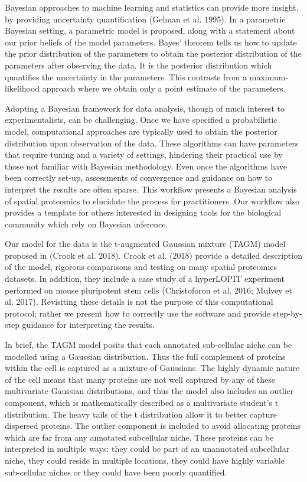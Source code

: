 \documentclass[
]{article}
\begin{document}
Bayesian approaches to machine learning and statistics can provide more
insight, by providing uncertainty quantification (Gelman et al. 1995).
In a parametric Bayesian setting, a parametric model is proposed, along
with a statement about our prior beliefs of the model parameters. Bayes'
theorem tells us how to update the prior distribution of the parameters
to obtain the posterior distribution of the parameters after observing
the data. It is the posterior distribution which quantifies the
uncertainty in the parameters. This contrasts from a maximum-likelihood
approach where we obtain only a point estimate of the parameters.

Adopting a Bayesian framework for data analysis, though of much interest
to experimentalists, can be challenging. Once we have specified a
probabilistic model, computational approaches are typically used to
obtain the posterior distribution upon observation of the data. These
algorithms can have parameters that require tuning and a variety of
settings, hindering their practical use by those not familiar with
Bayesian methodology. Even once the algorithms have been correctly
set-up, assessments of convergence and guidance on how to interpret the
results are often sparse. This workflow presents a Bayesian analysis of
spatial proteomics to elucidate the process for practitioners. Our
workflow also provides a template for others interested in designing
tools for the biological community which rely on Bayesian inference.

Our model for the data is the t-augmented Gaussian mixture (TAGM) model
proposed in (Crook et al. 2018). Crook et al. (2018) provide a detailed
description of the model, rigorous comparisons and testing on many
spatial proteomics datasets. In addition, they include a case study of a
hyperLOPIT experiment performed on mouse pluripotent stem cells
(Christoforou et al. 2016; Mulvey et al. 2017). Revisiting these details
is not the purpose of this computational protocol; rather we present how
to correctly use the software and provide step-by-step guidance for
interpreting the results.

In brief, the TAGM model posits that each annotated sub-cellular niche
can be modelled using a Gaussian distribution. Thus the full complement
of proteins within the cell is captured as a mixture of Gaussians. The
highly dynamic nature of the cell means that many proteins are not well
captured by any of these multivariate Gaussian distributions, and thus
the model also includes an outlier component, which is mathematically
described as a multivariate student's t distribution. The heavy tails of
the t distribution allow it to better capture dispersed proteins. The
outlier component is included to avoid allocating proteins which are far
from any annotated subcellular niche. These proteins can be interpreted
in multiple ways: they could be part of an unannotated subcellular
niche, they could reside in multiple locations, they could have highly
variable sub-cellular niches or they could have been poorly quantified.
\end{document}
